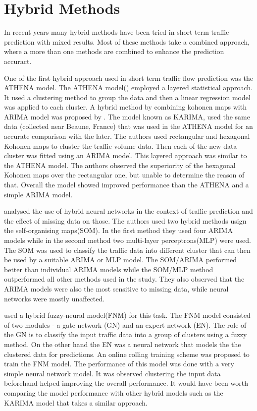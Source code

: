\section{Hybrid Methods}
In recent years many hybrid methods have been tried in short term traffic prediction with mixed
results. Most of these methods take a combined approach, where a more than one methods are combined
to enhance the prediction accuract.

One of the first hybrid approach used in short term traffic flow prediction was the ATHENA model.
The ATHENA model(\citet{danech1991athena}) employed a layered statistical approach. It
used a clustering method to group the data and then a linear regression model was applied
to each cluster. A hybrid method by combining kohonen maps with ARIMA model was proposed by
\citet{van1996combining}. The model known as KARIMA, used the same data (collected near Beaune,
France) that was used in the ATHENA model for an accurate comparison with the later. The authors
used rectangular and hexagonal Kohonen maps to cluster the traffic volume data. Then each of the
new data cluster was fitted using an ARIMA model. This layered approach was similar to the ATHENA
model. The authors observed the superiority of the hexagonal Kohonen maps over the rectangular one,
but unable to determine the reason of that. Overall the model showed improved performance than the
ATHENA and a simple ARIMA model.

\citet{chen2001study} analysed the use of hybrid neural networks in the context of traffic prediction
and the effect of missing data on those. The authors used two hybrid methods usign the self-organising
maps(SOM). In the first method they used four ARIMA models while in the second method two multi-layer
perceptrons(MLP) were used. The SOM was used to classify the traffic data into different cluster that
can then be used by a suitable ARIMA or MLP model. The SOM/ARIMA performed better than individual
ARIMA models while the SOM/MLP method outperformed all other methods used in the study. They also
observed that the ARIMA models were also the most sensitive to missing data, while neural networks
were mostly unaffected.

\citet{yin2002urban} used a hybrid fuzzy-neural model(FNM) for this task. The FNM model consisted of
two modules - a gate network (GN) and an expert network (EN). The role of the GN is to classify the
input traffic data into a group of clusters using a fuzzy method. On the other hand the EN was a
neural network that models the the clustered data for predictions. An online rolling training scheme
was proposed to train the FNM model. The performance of this model was done with a very simple neural
network model. It was observed clustering the input data beforehand helped improving the overall
performance. It would have been worth comparing the model performance with other hybrid models such
as the KARIMA model that takes a similar approach.

